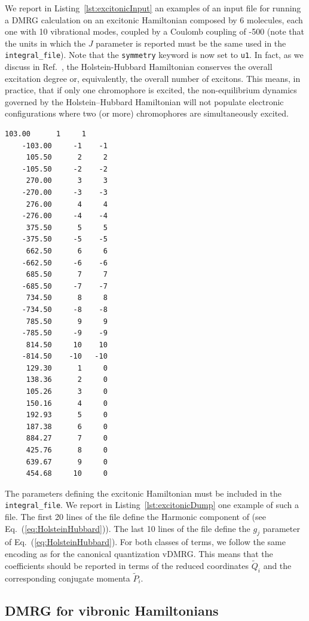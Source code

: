 \documentclass[bibliography=totoc,12pt,a4paper]{scrartcl}
\begin{document}
We report in Listing~\ref{lst:excitonicInput} an examples of an input file for running a DMRG calculation on an excitonic Hamiltonian composed by 6 molecules, each one with 10 vibrational modes, coupled by a Coulomb coupling of -500 (note that the units in which the $J$ parameter is reported must be the same used in the \texttt{integral\_file}).
Note that the \texttt{symmetry} keyword is now set to \texttt{u1}.
In fact, as we discuss in Ref.~, the Holstein-Hubbard Hamiltonian conserves the overall excitation degree or, equivalently, the overall number of excitons.
This means, in practice, that if only one chromophore is excited, the non-equilibrium dynamics governed by the Holstein--Hubbard Hamiltonian will not populate electronic configurations where two (or more) chromophores are simultaneously excited.

\begin{lstlisting}[language=qcmaquis,caption={Excitonic integral file format.},
				   label=lst:excitonicDump]
	 103.00      1     1
	-103.00     -1    -1
	 105.50      2     2
	-105.50     -2    -2
	 270.00      3     3
	-270.00     -3    -3
	 276.00      4     4
	-276.00     -4    -4
	 375.50      5     5
	-375.50     -5    -5
	 662.50      6     6
	-662.50     -6    -6
	 685.50      7     7
	-685.50     -7    -7
	 734.50      8     8
	-734.50     -8    -8
	 785.50      9     9
	-785.50     -9    -9
	 814.50     10    10
	-814.50    -10   -10
	 129.30      1     0
	 138.36      2     0
	 105.26      3     0
	 150.16      4     0
	 192.93      5     0
	 187.38      6     0
	 884.27      7     0
	 425.76      8     0
	 639.67      9     0
	 454.68     10     0
\end{lstlisting}

The parameters defining the excitonic Hamiltonian must be included in the \texttt{integral\_file}.
We report in Listing~\ref{lst:excitonicDump} one example of such a file.
The first 20 lines of the file define the Harmonic component of (see Eq.~(\ref{eq:HolsteinHubbard})).
The last 10 lines of the file define the $g_j$ parameter of Eq.~(\ref{eq:HolsteinHubbard}).
For both classes of terms, we follow the same encoding as for the canonical quantization vDMRG.
This means that the coefficients should be reported in terms of the reduced coordinates $\tilde{Q}_i$ and the corresponding conjugate momenta $\tilde{P}_i$.

\subsection{DMRG for vibronic Hamiltonians}
\label{sec:vibronic}
\end{document}
